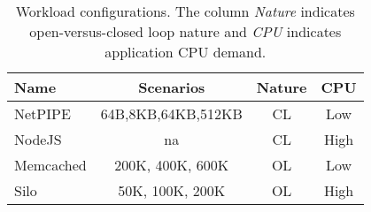 



\begin{table}[t]
\centering
\begin{tabular}{l|c|c|c}
  Name & Scenarios & Nature & CPU\\
  \hline
  NetPIPE & {\small 64B,8KB,64KB,512KB} & CL & Low\\ \hline
  NodeJS & na & CL & High \\ \hline
  Memcached & 200K, 400K, 600K & OL & Low \\ \hline
  Silo & 50K, 100K, 200K & OL & High \\ 
\end{tabular}
\caption{Workload configurations.
The column {\em Nature} indicates open-versus-closed loop nature
and {\em CPU} indicates application CPU demand.}
\label{table:wrkcfgs}	
\end{table}



